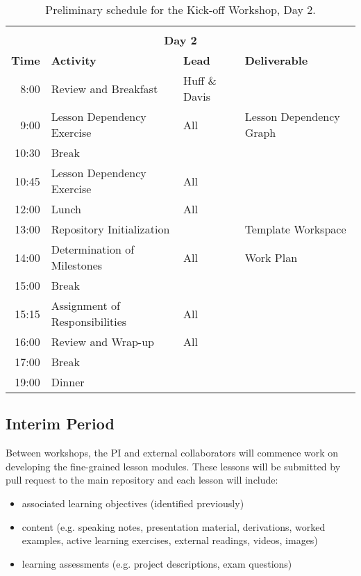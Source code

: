 \documentclass[11pt]{article}
\begin{document}
          \begin{table}[h!]
                  \centering
          \begin{tabularx}{\textwidth}{|r|l|l|X|}
                                  \multicolumn{4}{c}{}\\
                                  \multicolumn{4}{c}{\textbf{Day 2}}\\
                                  \hline
                          \textbf{Time}& \textbf{Activity}& \textbf{Lead}& \textbf{Deliverable}\\
                                  \hline
8:00& Review and Breakfast& Huff \& Davis& \\
9:00& Lesson Dependency Exercise& All& Lesson Dependency Graph\\
10:30& Break&&  \\
10:45& Lesson Dependency Exercise& All& \\
12:00& Lunch& All& \\
13:00& Repository Initialization&&  Template Workspace\\
14:00& Determination of Milestones& All& Work Plan\\
15:00& Break&&  \\
15:15& Assignment of Responsibilities& All&  \\
16:00& Review and Wrap-up& All&  \\
17:00& Break&&  \\
19:00& Dinner&&  \\
\hline
                  \end{tabularx}
                  \caption{Preliminary schedule for the Kick-off Workshop, Day 2.}
                  \label{tab:kickoff2}
          \end{table}

\FloatBarrier
          \subsection{Interim Period}
          Between workshops, the PI and external collaborators will commence 
          work on developing 
          the fine-grained lesson modules. These lessons will be submitted by pull request to the main 
          repository and each lesson will include:
          \begin{itemize} 
                \item associated learning objectives (identified previously)
                \item content (e.g. speaking notes, presentation material, 
                      derivations, worked examples, active learning  
                      exercises, external readings, videos, images)
                \item learning assessments (e.g. project descriptions, exam questions) 
          \end{itemize} 
\end{document}

